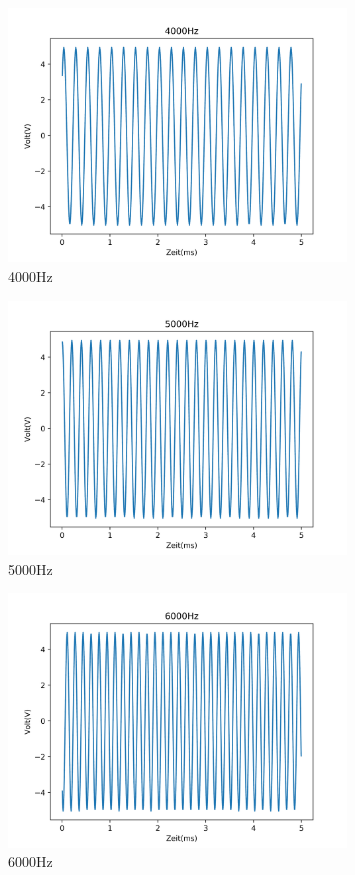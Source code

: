 \documentclass[12pt, oneside, a4paper, \docLanguage]{report}
\begin{document}
\begin{figure}[H]
	\centering
	\includegraphics[width=0.8\textwidth]{../Images/4000Hz.png}
	\caption{4000Hz}
\end{figure}
\begin{figure}[H]
	\centering
	\includegraphics[width=0.8\textwidth]{../Images/5000Hz.png}
	\caption{5000Hz}
\end{figure}
\begin{figure}[H]
	\centering
	\includegraphics[width=0.8\textwidth]{../Images/6000Hz.png}
	\caption{6000Hz}
\end{figure}
\end{document}
